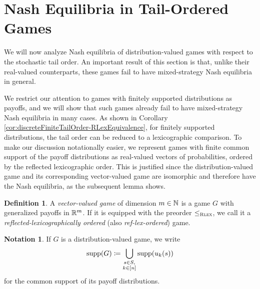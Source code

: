 \documentclass[a4paper]{scrreprt}
\theoremstyle{definition}
\newtheorem{defn}[thm]{Definition} %
\newtheorem{notation}[thm]{Notation}
\begin{document}
     
    
    \section{Nash Equilibria in Tail-Ordered Games}
    We will now analyze Nash equilibria of distribution-valued games with respect to the stochastic tail order.
    An important result of this section is that, unlike their real-valued counterparts, these games fail to have mixed-strategy Nash equilibria in general.
    
    We restrict our attention to games with finitely supported distributions as payoffs, and we will show that such games already fail to have mixed-strategy Nash equilibria in many cases.
    As shown in Corollary \ref{cor:discreteFiniteTailOrder-RLexEquivalence}, for finitely supported distributions, the tail order can be reduced to a lexicographic comparison.
    To make our discussion notationally easier, we represent games with finite common support of the payoff distributions as real-valued vectors of probabilities, ordered by the reflected lexicographic order. This is justified since the distribution-valued game and its corresponding vector-valued game are isomorphic and therefore have the Nash equilibria, as the subsequent lemma shows.
    \begin{defn}
        A \emph{vector-valued game} of dimension $m \in \mathbb{N}$ is a game $G$ with generalized payoffs in $\mathbb{R}^m$.
        If it is equipped with the preorder $\leq_{\textsc{Rlex}}$, we call it a \emph{reflected-lexicographically ordered} (also \emph{ref-lex-ordered}) game.
    \end{defn}

    \begin{notation}
        If $G$ is a distribution-valued game, we write
        \begin{gather*}
            \operatorname{supp}(G) \coloneqq \bigcup\limits_{\substack{s \in S,\\k \in [n]}} \operatorname{supp}(u_k(s))
        \end{gather*}
        for the common support of its payoff distributions.
    \end{notation}
\end{document}
